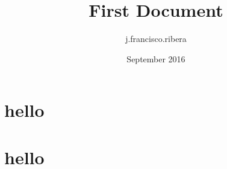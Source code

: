 \documentclass{article}
\title{First Document}
\author{j.francisco.ribera }
\date{September 2016}
\begin{document}
    \tableofcontents
    \section{hello}
    \section{hello}
\end{document}
